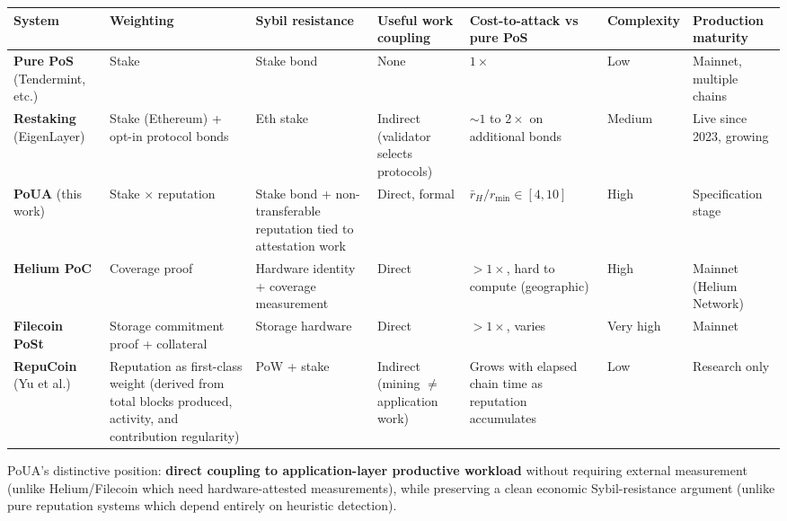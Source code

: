 \documentclass[
  11pt,
]{article}
\renewcommand{\arraystretch}{1.25}
\begin{document}
\begin{landscape}
\begingroup
\renewcommand{\arraystretch}{1.4}
\small
\setlength{\tabcolsep}{4pt}
\begin{longtable}{>{\raggedright\arraybackslash}p{2.0cm} >{\raggedright\arraybackslash}p{2.6cm} >{\raggedright\arraybackslash}p{3.4cm} >{\raggedright\arraybackslash}p{3.6cm} >{\raggedright\arraybackslash}p{3.4cm} >{\raggedright\arraybackslash}p{1.4cm} >{\raggedright\arraybackslash}p{3.0cm}}
\rowcolor{tableheaderbg}
\textbf{System} & \textbf{Weighting} & \textbf{Sybil resistance} & \textbf{Useful work coupling} & \textbf{Cost-to-attack vs pure PoS} & \textbf{Complexity} & \textbf{Production maturity} \\
\midrule
\endhead
\textbf{Pure PoS} (Tendermint, etc.) & Stake & Stake bond & None & $1\times$ & Low & Mainnet, multiple chains \\
\rowcolor{tablerowalt}
\textbf{Restaking} (EigenLayer) & Stake (Ethereum) + opt-in protocol bonds & Eth stake & Indirect (validator selects protocols) & $\sim 1$ to $2\times$ on additional bonds & Medium & Live since 2023, growing \\
\textbf{PoUA} (this work) & Stake $\times$ reputation & Stake bond + non-transferable reputation tied to attestation work & Direct, formal & $\bar{r}_H / r_{\min} \in [4, 10]$ & High & Specification stage \\
\rowcolor{tablerowalt}
\textbf{Helium PoC} & Coverage proof & Hardware identity + coverage measurement & Direct & $> 1\times$, hard to compute (geographic) & High & Mainnet (Helium Network) \\
\textbf{Filecoin PoSt} & Storage commitment proof + collateral & Storage hardware & Direct & $> 1\times$, varies & Very high & Mainnet \\
\rowcolor{tablerowalt}
\textbf{RepuCoin} (Yu et al.) & Reputation as first-class weight (derived from total blocks produced, activity, and contribution regularity) & PoW + stake & Indirect (mining $\neq$ application work) & Grows with elapsed chain time as reputation accumulates & Low & Research only \\
\bottomrule
\end{longtable}
\endgroup
\end{landscape}

PoUA's distinctive position: \textbf{direct coupling to
application-layer productive workload} without requiring external
measurement (unlike Helium/Filecoin which need hardware-attested
measurements), while preserving a clean economic Sybil-resistance
argument (unlike pure reputation systems which depend entirely on
heuristic detection).
\end{document}
